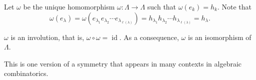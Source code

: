 Let \(\omega\) be the unique homomorphism \(\omega: \Lambda \to \Lambda\) such that \(\omega(e_k) = h_k\). Note that
\begin{equation}
    \omega(e_{\lambda}) = \omega(e_{\lambda_1} e_{\lambda_2} \cdots e_{\lambda_{\ell(\lambda)}}) = h_{\lambda_1} h_{\lambda_2} \cdots h_{\lambda_{\ell(\lambda)}} = h_\lambda.
\end{equation}

\begin{theorem} \label{thm:omega-involution}
    \(\omega\) is an involution, that is, \(\omega \circ \omega = \operatorname{id}\).
	As a consequence, \(\omega\) is an isomorphism of \(\Lambda\).
\end{theorem}

This is one version of a symmetry that appears in many contexts in algebraic combinatorics.

